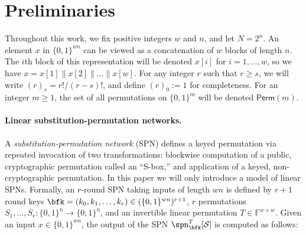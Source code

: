 

\section{Preliminaries}
\label{sec:preliminary}

Throughout this work, we fix positive integers $w$ and $n$, and let $N=2^n$. An element $x$ in $\{0,1\}^{wn}$ can be viewed as a concatenation of $w$ blocks of length $n$. The $i$th block of this representation will be denoted $x[i]$ for $i=1,\ldots,w$, so we have $x=x[1]\|x[2]\|\ldots\|x[w]$. For any integer $r$ such that $r\geq s$, we will write $(r)_s = r!/(r-s)!$, and define $(r)_0:=1$ for completeness. For an integer $m\geq1$, the set of all permutations on $\{0, 1\}^m$ will be denoted $\textsf{Perm}(m)$.




%


\paragraph{Linear substitution-permutation networks.}

A \emph{substitution-permutation network} (SPN) defines a keyed permutation via repeated invocation of two transformations: blockwise computation of a public, cryptographic permutation called an ``S-box,'' and application of a keyed, non-cryptographic permutation. In this paper we will only introduce a model of linear SPNs.
%
%
Formally, an $r$-round SPN taking inputs of length $w n$ is defined by $r+1$ round keys $\bfk=(k_0,k_1,\ldots,k_r)\in(\{0,1\}^{wn})^{r+1}$, $r$ permutations $S_1,\ldots,S_r:\{0,1\}^{n} \rightarrow \{0,1\}^{n}$, and an invertible linear permutation $T\in\mathbb{F}^{w\times w}$. Given an input $x \in \{0,1\}^{w n}$, the output of the SPN $\spn_{\bfk}^T[\mathcal{S}]$ is computed as follows:

